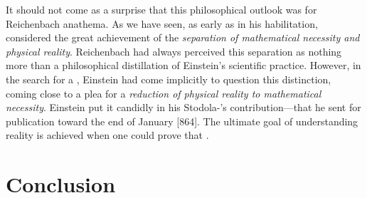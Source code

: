 \documentclass[draft]{article}
\begin{document}
It should not come as a surprise that this philosophical outlook was for Reichenbach anathema. As we have seen, as early as in his habilitation, considered  the great achievement of \rt the \emph{separation of mathematical necessity and physical reality}. Reichenbach had always perceived this separation as nothing more than a philosophical distillation of Einstein's scientific practice. However, in the search for a \uft, Einstein had come implicitly to question this distinction, coming close to a plea for a \emph{reduction of physical reality to mathematical necessity}. Einstein put it candidly in his Stodola-'s contribution---that he sent for publication toward the end of January [864]. The ultimate goal of understanding reality is achieved when one could prove that  \citep[127]{Einstein1929}.






\section{Conclusion}
\end{document}

